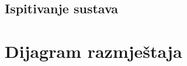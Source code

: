 			\subsection{Ispitivanje sustava}
			
			 
			
			\eject 
		
		
		\section{Dijagram razmještaja}
			
			
